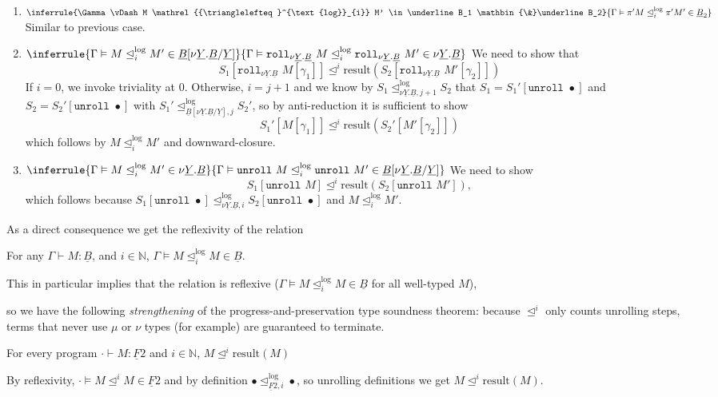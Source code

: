 \documentclass[acmsmall,nonacm]{acmart}
\renewcommand{\u}{\underline}
\newcommand{\apreorder}{\trianglelefteq}
\newcommand{\ix}[2]{\mathrel{#1^{#2}}}
\newcommand{\itylrof}[3]{\ilrof{#1}{#3,#2}}
\newcommand{\ilrof}[2]{\mathrel{{#1}^{\text{log}}_{#2}}}
\newcommand{\itylr}[2]{\itylrof{\apreorder}{#1}{#2}}
\newcommand{\ilr}[1]{\ilrof{\apreorder}{#1}}
\newcommand{\rollty}[1]{\texttt{roll}_{#1}\,\,}
\newcommand{\unroll}{\kw{unroll}}
\newcommand{\result}{\text{result}}
\newcommand{\kw}[1]{\texttt{#1}\,\,}
\newcommand{\with}{\mathbin{\&}}
\begin{document}
{\begin{longproof}
\begin{enumerate}
  \item $\inferrule {\Gamma \vDash M \ilr i M' \in \u B_1 \with \u
    B_2} {\Gamma \vDash \pi' M \ilr i \pi' M' \in \u B_2}$ Similar
    to previous case.

  \item $\inferrule
    {\Gamma \vDash M \ilr i M' \in \u B[{\nu \u Y. \u B}/\u Y]}
    {\Gamma \vDash \rollty{\nu \u Y. \u B} M \ilr i \rollty{\nu \u Y. \u B} M' \in {\nu \u Y. \u B}}$
    We need to show that
    \[ S_1[ \rollty{\nu \u Y. \u B} M[\gamma_1]]
    \ix\apreorder i \result(S_2[ \rollty{\nu \u Y. \u B} M'[\gamma_2]]) \]
    If $i = 0$, we invoke triviality at $0$.
    Otherwise, $i = j + 1$ and we know by $S_1 \itylr {j+1} {\nu \u Y. \u B} S_2$ that
    $S_1 = S_1'[\unroll \bullet]$ and $S_2 = S_2'[\unroll \bullet]$ with $S_1' \itylr j {\u B[{\nu \u Y. \u B}/\u Y]} S_2'$, so by anti-reduction it is sufficient to show
    \[ S_1'[ M[\gamma_1]] \ix\apreorder i \result(S_2'[ M'[\gamma_2]]) \]
    which follows by $M \ilr i M'$ and downward-closure.

  \item $\inferrule
    {\Gamma \vDash M \ilr i M' \in {\nu \u Y. \u B}}
    {\Gamma \vDash \unroll M \ilr i \unroll M' \in \u B[{\nu \u Y. \u B}/\u Y]}$
    We need to show
    \[S_1[\unroll M] \ix\apreorder i \result(S_2[\unroll M']),\] which
    follows because $S_1[\unroll \bullet] \itylr i {\nu \u Y. \u B}
    S_2[\unroll \bullet]$ and $M \ilr i M'$.
  \end{enumerate}
\end{longproof}

\begin{longonly}
As a direct consequence we get the reflexivity of the relation
\begin{corollary}[Reflexivity]
  For any $\Gamma \vdash M : \u B$, and $i \in \mathbb{N}$,
  \(\Gamma \vDash M \ilrof\apreorder i  M \in \u B.\)
\end{corollary}
\end{longonly}

\begin{shortonly}
  This in particular implies that the relation is reflexive ($\Gamma
  \vDash M \ilrof\apreorder i M \in \u B$ for all well-typed $M$),
\end{shortonly}
so we
have the following \emph{strengthening} of the progress-and-preservation
type soundness theorem: because $\ix\apreorder i$ only counts unrolling
steps, terms that never use $\mu$ or $\nu$ types (for example) are
guaranteed to terminate.
\begin{corollary}[Unary LR]
  For every program $\cdot \vdash M : \u F 2$ and $i \in \mathbb{N}$,
  $M \ix\apreorder i \result(M)$
\end{corollary}
\begin{longproof}
  By reflexivity, $\cdot \vDash M \ix\apreorder i M \in \u F 2$ and by
  definition $\bullet \itylrof\apreorder i {\u F 2} \bullet$, so
  unrolling definitions we get $M \ix\apreorder i \result(M)$.  
\end{longproof}

}
\end{document}
